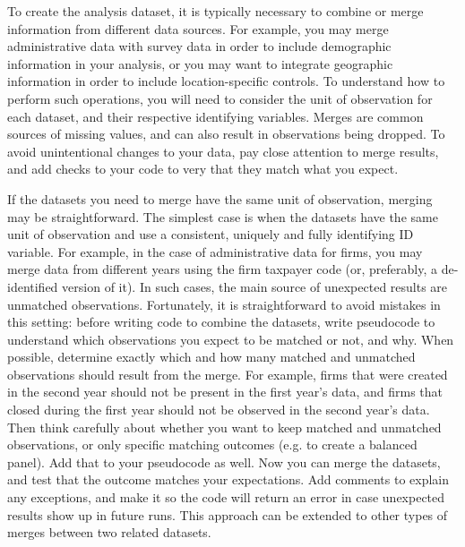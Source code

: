 To create the analysis dataset,
it is typically necessary to combine or merge information
from different data sources.
For example, you may merge administrative data with survey data
in order to include demographic information in your analysis,
or you may want to integrate geographic information
in order to include location-specific controls.
To understand how to perform such operations,
you will need to consider the unit of observation for each dataset,
and their respective identifying variables.
Merges are common sources of missing values,
and can also result in observations being dropped.
To avoid unintentional changes to your data,
pay close attention to merge results,
and add checks to your code to very that they match what you expect.

If the datasets you need to merge have the same unit of observation,
merging may be straightforward.
The simplest case is when the datasets have the same unit of observation
and use a consistent, uniquely and fully identifying ID variable.
For example, in the case of administrative data for firms,
you may merge data from different years using the firm taxpayer code
(or, preferably, a de-identified version of it).
In such cases, the main source of unexpected results are unmatched observations.
Fortunately, it is straightforward to avoid mistakes in this setting:
before writing code to combine the datasets,
write pseudocode to understand which observations you expect to be
matched or not, and why.
When possible, determine exactly which and how many
matched and unmatched observations should result from the merge.
For example, firms that were created in the second year should not be
present in the first year's data,
and firms that closed during the first year should not be observed in the second year's data.
Then think carefully about whether you want to keep matched and unmatched
observations, or only specific matching outcomes (e.g. to create a balanced panel).
Add that to your pseudocode as well.
Now you can merge the datasets,
and test that the outcome matches your expectations.
Add comments to explain any exceptions,
and make it so the code will return an error in case unexpected results show up in future runs.
This approach can be extended to other types of merges between two related datasets.

